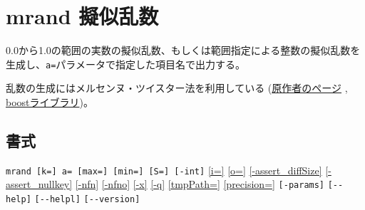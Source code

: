 
%

\section{mrand 擬似乱数\label{sect:mrand}}
0.0から1.0の範囲の実数の擬似乱数、もしくは範囲指定による整数の擬似乱数を生成し、\verb|a=|パラメータで指定した項目名で出力する。

乱数の生成にはメルセンヌ・ツイスター法を利用している
(\href{http://www.math.sci.hiroshima-u.ac.jp/~m-mat/MT/emt.html}{原作者のページ}
, \href{http://www.boost.org/doc/libs/1_54_0/doc/html/boost_random.html}{boostライブラリ})。


\subsection*{書式}
\verb/mrand [k=] a= [max=] [min=] [S=] [-int]/
\hyperref[sect:option_i]{[i=]}
\hyperref[sect:option_o]{[o=]}
\hyperref[sect:option_assert_diffSize]{[-assert\_diffSize]}
\hyperref[sect:option_assert_nullkey]{[-assert\_nullkey]}
\hyperref[sect:option_nfn]{[-nfn]} 
\hyperref[sect:option_nfno]{[-nfno]}  
\hyperref[sect:option_x]{[-x]}
\hyperref[sect:option_q]{[-q]}  
\hyperref[sect:option_option_tmppath]{[tmpPath=]}
\hyperref[sect:option_precision]{[precision=]}
\verb|[-params]|
\verb|[--help]|
\verb|[--helpl]|
\verb|[--version]|\\

